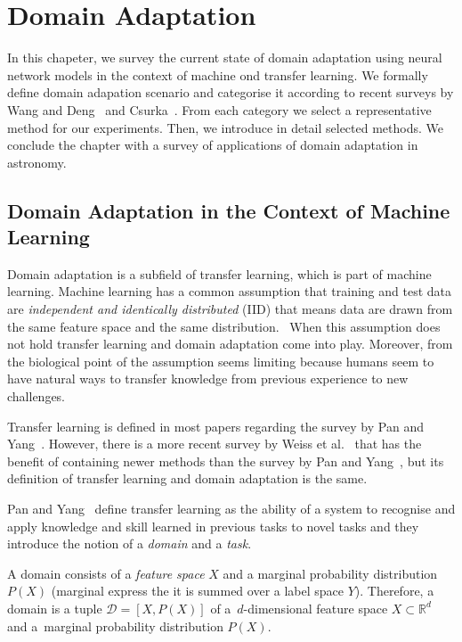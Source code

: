 \chapter{Domain Adaptation}
\label{da_chapter}

In this chapeter, we survey the current state of domain adaptation using neural network models
in the context of machine ond transfer learning.
We formally define domain adapation scenario
and categorise it according to recent surveys
by Wang and Deng~\cite{wang2018} and Csurka~\cite{csurka2017}.
From each category we select a representative method for our experiments.
Then, we introduce in detail selected methods.
We conclude the chapter with a survey of applications of domain adaptation in astronomy.

\section{Domain Adaptation in the Context of Machine Learning}

Domain adaptation is a subfield of transfer learning,
which is part of machine learning.
Machine learning has a common assumption that training and test data are
\textit{independent and identically distributed} (IID)
that means data are drawn from the same feature space and the same distribution.~\cite{daume2006}
When this assumption does not hold transfer learning and domain adaptation come into play.
Moreover, from the biological point of the assumption seems limiting
because humans seem to have natural ways to transfer knowledge from previous experience to new challenges.~\cite{torrey2010}

Transfer learning is defined in most papers regarding the survey by Pan and Yang~\cite{pan2010}.
However, there is a more recent survey by Weiss et al.~\cite{weiss2016}
that has the benefit of containing newer methods than the survey by Pan and Yang~\cite{pan2010},
but its definition of transfer learning and domain adaptation is the same.

Pan and Yang~\cite{pan2010} define transfer learning
as the ability of a system to recognise and apply knowledge and skill
learned in previous tasks to novel tasks
and they introduce the notion of a \textit{domain} and a \textit{task}.

A domain consists of a \textit{feature space} \(X\) and a marginal probability distribution \(P(X)\)
(marginal express the it is summed over a label space \(Y\)).
Therefore, a domain is a tuple \(\mathcal{D} = [X, P(X)]\)
of a~\(d\)-dimensional feature space \(X \subset \mathbb{R}^d\)
and a~marginal probability distribution \(P(X)\).

